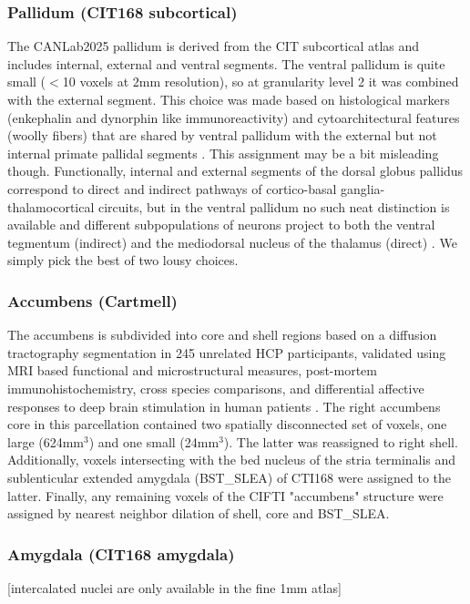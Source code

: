\documentclass[10pt,letterpaper]{article}
\begin{document}
\subsubsection{Pallidum (CIT168 subcortical)} The CANLab2025 pallidum is derived from the CIT subcortical atlas and includes internal, external and ventral segments. The ventral pallidum is quite small ($<$10 voxels at 2mm resolution), so at granularity level 2 it was combined with the external segment. This choice was made based on histological markers (enkephalin and dynorphin like immunoreactivity) and cytoarchitectural features (woolly fibers) that are shared by ventral pallidum with the external but not internal primate pallidal segments . This assignment may be a bit misleading though. Functionally, internal and external segments of the dorsal globus pallidus correspond to direct and indirect pathways of cortico-basal ganglia-thalamocortical circuits, but in the ventral pallidum no such neat distinction is available and different subpopulations of neurons project to both the ventral tegmentum (indirect) and the mediodorsal nucleus of the thalamus (direct) . We simply pick the best of two lousy choices.
\\
\subsubsection{Accumbens (Cartmell)} The accumbens is subdivided into core and shell regions based on a diffusion tractography segmentation in 245 unrelated HCP participants, validated using MRI based functional and microstructural measures, post-mortem immunohistochemistry, cross species comparisons, and differential affective responses to deep brain stimulation in human patients . The right accumbens core in this parcellation contained two spatially disconnected set of voxels, one large (624mm$^3$) and one small (24mm$^3$). The latter was reassigned to right shell. Additionally, voxels intersecting with the bed nucleus of the stria terminalis and sublenticular extended amygdala (BST\_SLEA) of CTI168  were assigned to the latter. Finally, any remaining voxels of the CIFTI "accumbens" structure were assigned by nearest neighbor dilation of shell, core and BST\_SLEA.
\\
\subsubsection{Amygdala (CIT168 amygdala)} [intercalated nuclei are only available in the fine 1mm atlas]
\\
\end{document}
